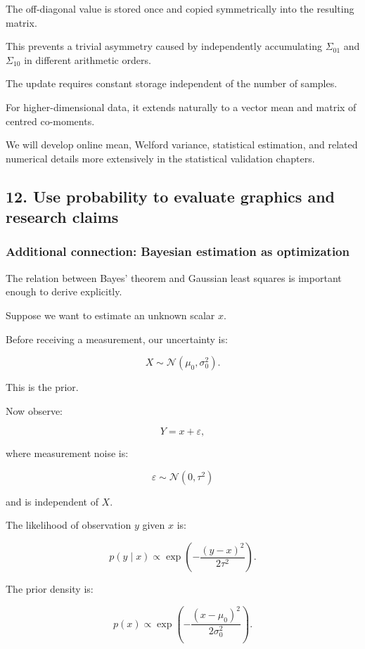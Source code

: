 The off-diagonal value is stored once and copied symmetrically into the resulting matrix.

This prevents a trivial asymmetry caused by independently accumulating \(\Sigma_{01}\) and \(\Sigma_{10}\) in different arithmetic orders.

The update requires constant storage independent of the number of samples.

For higher-dimensional data, it extends naturally to a vector mean and matrix of centred co-moments.

We will develop online mean, Welford variance, statistical estimation, and related numerical details more extensively in the statistical validation chapters.

\subsection{12. Use probability to evaluate graphics and research claims}\label{use-probability-to-evaluate-graphics-and-research-claims}

\subsubsection{Additional connection: Bayesian estimation as optimization}\label{additional-connection-bayesian-estimation-as-optimization}

The relation between Bayes' theorem and Gaussian least squares is important enough to derive explicitly.

Suppose we want to estimate an unknown scalar \(x\).

Before receiving a measurement, our uncertainty is:

\[
 X\sim\mathcal N(\mu_0,\sigma_0^2).
\]

This is the prior.

Now observe:

\[
 Y=x+\varepsilon,
\]

where measurement noise is:

\[
 \varepsilon\sim\mathcal N(0,\tau^2)
\]

and is independent of \(X\).

The likelihood of observation \(y\) given \(x\) is:

\[
 p(y\mid x) \propto \exp\left( -\frac{(y-x)^2}{2\tau^2} \right).
\]

The prior density is:

\[
 p(x)\propto \exp\left( -\frac{(x-\mu_0)^2}{2\sigma_0^2} \right).
\]

